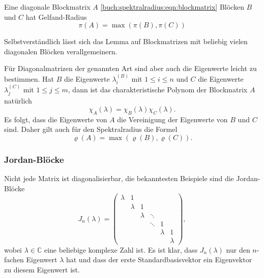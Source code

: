 \begin{lemma}
\label{buch:spektralradius:lemma:diagonalbloecke}
Eine diagonale Blockmatrix $A$ \eqref{buch:spektralradius:eqn:blockmatrix}
Blöcken $B$ und $C$  hat Gelfand-Radius
\[
\pi(A) = \max ( \pi(B), \pi(C) )
\]
\end{lemma}

Selbstverständlich lässt sich das Lemma auf Blockmatrizen mit beliebig
vielen diagonalen Blöcken verallgemeinern.
%

Für Diagonalmatrizen der genannten Art sind aber auch die 
Eigenwerte leicht zu bestimmen.
%
Hat $B$ die Eigenwerte $\lambda_i^{(B)}$ mit $1\le i\le n$ und $C$ die
Eigenwerte $\lambda_j^{(C)}$ mit $1\le j\le m$, dann ist das charakteristische
Polynom der Blockmatrix $A$ natürlich
%
%
\[
\chi_A(\lambda) = \chi_B(\lambda)\chi_C(\lambda).
\]
Es folgt, dass die Eigenwerte von $A$ die Vereinigung der Eigenwerte
von $B$ und $C$ sind.
Daher gilt auch für den Spektralradius die Formel
\[
\varrho(A) = \max(\varrho(B) , \varrho(C)).
\]

\subsubsection{Jordan-Blöcke}
%
Nicht jede Matrix ist diagonalisierbar, die bekanntesten Beispiele sind
die Jordan-Blöcke
\begin{equation}
J_n(\lambda)
=
\begin{pmatrix}
\lambda &      1&       &       &       &       \\
        &\lambda&      1&       &       &       \\[-5pt]
        &       &\lambda&\ddots &       &       \\[-5pt]
        &       &       &\ddots &      1&       \\
        &       &       &       &\lambda&      1\\
        &       &       &       &       &\lambda
\end{pmatrix},
\label{buch:spektralradius:eqn:jordan}
\end{equation}
wobei $\lambda\in\mathbb C$ eine beliebige komplexe Zahl ist.
Es ist klar, dass $J_n(\lambda)$ nur den $n$-fachen Eigenwert
$\lambda$ hat und dass der erste Standardbasisvektor ein
Eigenvektor zu diesem Eigenwert ist.

